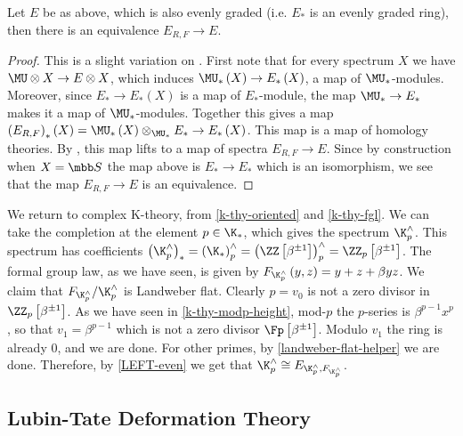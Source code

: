 \begin{theorem}\label{LEFT-even}
	Let $E$ be as above, which is also evenly graded (i.e. $E_*$ is an evenly graded ring), then there is an equivalence $E_{R,F} \to E$.
\end{theorem}

\begin{proof}
	This is a slight variation on \cite[18, proposition 11]{Lur}.
	First note that for every spectrum $X$ we have $\MU \otimes X \to E \otimes X$, which induces $\MU_*\left(X\right) \to E_*\left(X\right)$, a map of $\MU_*$-modules.
	Moreover, since $E_* \to E_*\left(X\right)$ is a map of $E_*$-module, the map $\MU_* \to E_*$ makes it a map of $\MU_*$-modules.
	Together this gives a map $\left(E_{R,F}\right)_*\left(X\right) = \MU_*\left(X\right) \otimes_{\MU_*} E_* \to E_*\left(X\right)$.
	This map is a map of homology theories. 
	By \cite[17, theorem 6]{Lur} , this map lifts to a map of spectra $E_{R,F} \to E$.
	Since by construction when $X = \SS$ the map above is $E_* \to E_*$ which is an isomorphism, we see that the map $E_{R,F} \to E$ is an equivalence.
\end{proof}

\begin{example}\label{k-thy-comp-left}
	We return to complex K-theory, from \ref{k-thy-oriented} and \ref{k-thy-fgl}.
	We can take the completion at the element $p \in \K_*$, which gives the spectrum $\K_p^\wedge$.
	This spectrum has coefficients
	$
	\left(\K_p^\wedge\right)_*
	= \left(\K_*\right)_p^\wedge
	= \left(\ZZ\left[\beta^{\pm 1}\right]\right)_p^\wedge
	= \ZZ_p\left[\beta^{\pm 1}\right]
	$.
	The formal group law, as we have seen, is given by $F_{\K_p^\wedge}\left(y,z\right) = y + z + \beta y z$.
	We claim that $F_{\K_p^\wedge}/\K_p^\wedge$ is Landweber flat.
	Clearly $p = v_0$ is not a zero divisor in $\ZZ_p\left[\beta^{\pm 1}\right]$.
	As we have seen in \ref{k-thy-modp-height}, mod-$p$ the $p$-series is $\beta^{p-1} x^p$, so that $v_1 = \beta^{p-1}$ which is not a zero divisor $\Fp\left[\beta^{\pm 1}\right]$.
	Modulo $v_1$ the ring is already $0$, and we are done.
	For other primes, by \ref{landweber-flat-helper} we are done.
	Therefore, by \ref{LEFT-even} we get that $\K_p^\wedge \cong E_{\K_p^\wedge, F_{\K_p^\wedge}}$.
\end{example}



\subsection{Lubin-Tate Deformation Theory}\label{LT-def}

